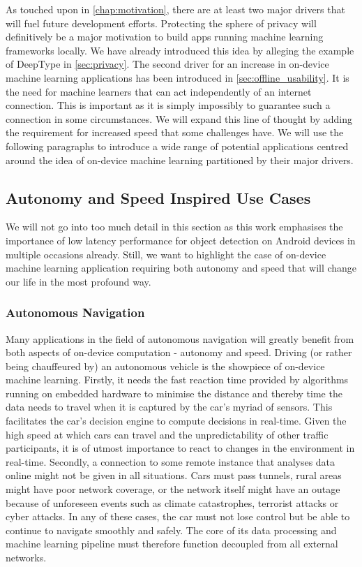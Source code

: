 \documentclass[
			   fontsize=11pt,
               paper=a4,
               bibliography=totoc,
               idxtotoc,
               headsepline,
               footsepline,
               footinclude=false,
               BCOR=12mm,
               DIV=13,
               openany,   %
               oneside    %
               ]
               {scrbook}
\begin{document}
As touched upon in \autoref{chap:motivation}, there are at least two major drivers that will fuel future development efforts. Protecting the sphere of privacy will definitively be a major motivation to build apps running machine learning frameworks locally. We have already introduced this idea by alleging the example of DeepType in \autoref{sec:privacy}. The second driver for an increase in on-device machine learning applications has been introduced in \autoref{sec:offline_usability}. It is the need for machine learners that can act independently of an internet connection. This is important as it is simply impossibly to guarantee such a connection in some circumstances. We will expand this line of thought by adding the requirement for increased speed that some challenges have. We will use the following paragraphs to introduce a wide range of potential applications centred around the idea of on-device machine learning partitioned by their major drivers.

\subsection{Autonomy and Speed Inspired Use Cases}

We will not go into too much detail in this section as this work emphasises the importance of low latency performance for object detection on Android devices in multiple occasions already. Still, we want to highlight the case of on-device machine learning application requiring both autonomy and speed that will change our life in the most profound way.

\subsubsection{Autonomous Navigation}
Many applications in the field of autonomous navigation will greatly benefit from both aspects of on-device computation - autonomy and speed. Driving (or rather being chauffeured by) an autonomous vehicle is the showpiece of on-device machine learning. Firstly, it needs the fast reaction time provided by algorithms running on embedded hardware to minimise the distance and thereby time the data needs to travel when it is captured by the car's myriad of sensors. This facilitates the car's decision engine to compute decisions in real-time. Given the high speed at which cars can travel and the unpredictability of other traffic participants, it is of utmost importance to react to changes in the environment in real-time. Secondly, a connection to some remote instance that analyses data online might not be given in all situations. Cars must pass tunnels, rural areas might have poor network coverage, or the network itself might have an outage because of unforeseen events such as climate catastrophes, terrorist attacks or cyber attacks. In any of these cases, the car must not lose control but be able to continue to navigate smoothly and safely. The core of its data processing and machine learning pipeline must therefore function decoupled from all external networks. \\
\end{document}
